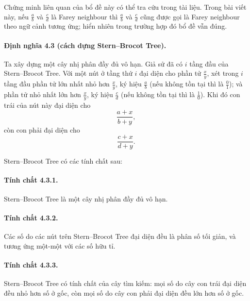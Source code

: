 \documentclass[11pt]{article}
\begin{document}
Chứng minh liên quan của bổ đề này có thể tra cứu trong tài liệu. Trong bài
viết này, nếu \(\frac{a}{b}\) và \(\frac{c}{d}\) là Farey neighbour thì
\(\frac{a}{b}\) và \(\frac{c}{d}\) cũng được gọi là Farey neighbour theo ngữ
cảnh tương ứng; hiển nhiên trong trường hợp đó bổ đề vẫn đúng.

\paragraph{Định nghĩa 4.3 (cách dựng Stern--Brocot Tree).}
Ta xây dựng một cây nhị phân đầy đủ vô hạn. Giả sử đã có \(i\) tầng đầu của
Stern--Brocot Tree. Với một nút ở tầng thứ \(i\) đại diện cho phần tử
\(\frac{x}{y}\), xét trong \(i\) tầng đầu phần tử lớn nhất nhỏ hơn
\(\frac{x}{y}\), ký hiệu \(\frac{a}{b}\) (nếu không tồn tại thì là
\(\frac{0}{1}\)); và phần tử nhỏ nhất lớn hơn \(\frac{x}{y}\), ký hiệu
\(\frac{c}{d}\) (nếu không tồn tại thì là \(\frac{1}{0}\)). Khi đó con trái của
nút này đại diện cho
\[
  \frac{a+x}{b+y},
\]
còn con phải đại diện cho
\[
  \frac{c+x}{d+y}.
\]

\begin{center}
\end{center}

Stern--Brocot Tree có các tính chất sau:

\paragraph{Tính chất 4.3.1.}
Stern--Brocot Tree là một cây nhị phân đầy đủ vô hạn.

\paragraph{Tính chất 4.3.2.}
Các số do các nút trên Stern--Brocot Tree đại diện đều là phân số tối giản, và
tương ứng một-một với các số hữu tỉ.

\paragraph{Tính chất 4.3.3.}
Stern--Brocot Tree có tính chất của cây tìm kiếm: mọi số do cây con trái đại
diện đều nhỏ hơn số ở gốc, còn mọi số do cây con phải đại diện đều lớn hơn số
ở gốc.
\end{document}
